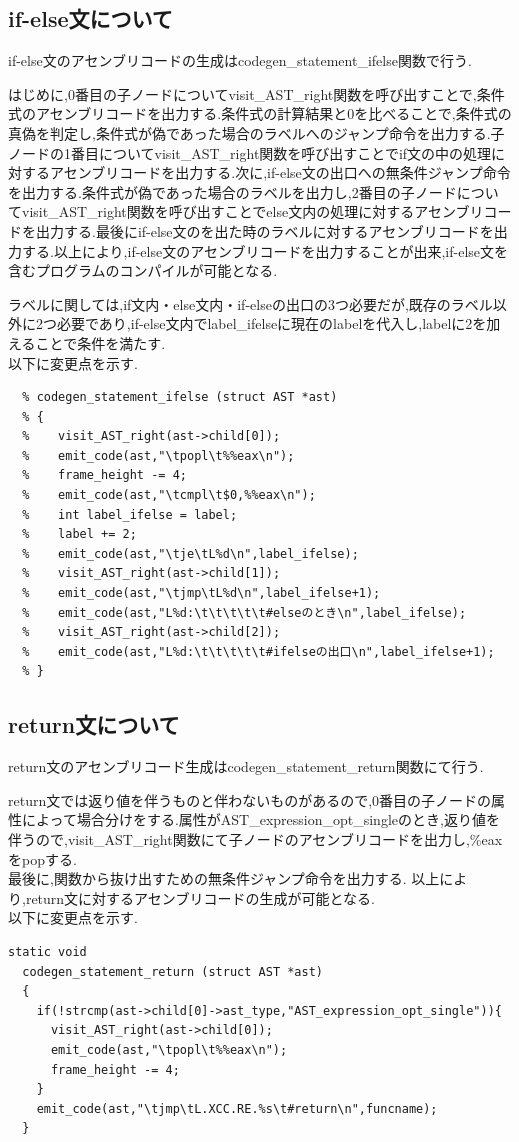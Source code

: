 \documentclass[10pt]{jsarticle}
\begin{document}
\subsection{if-else文について}
if-else文のアセンブリコードの生成はcodegen\_statement\_ifelse関数で行う.
\par はじめに,0番目の子ノードについてvisit\_AST\_right関数を呼び出すことで,条件式のアセンブリコードを出力する.条件式の計算結果と0を比べることで,条件式の真偽を判定し,条件式が偽であった場合のラベルへのジャンプ命令を出力する.子ノードの1番目についてvisit\_AST\_right関数を呼び出すことでif文の中の処理に対するアセンブリコードを出力する.次に,if-else文の出口への無条件ジャンプ命令を出力する.条件式が偽であった場合のラベルを出力し,2番目の子ノードについてvisit\_AST\_right関数を呼び出すことでelse文内の処理に対するアセンブリコードを出力する.最後にif-else文のを出た時のラベルに対するアセンブリコードを出力する.以上により,if-else文のアセンブリコードを出力することが出来,if-else文を含むプログラムのコンパイルが可能となる.
\par ラベルに関しては,if文内・else文内・if-elseの出口の3つ必要だが,既存のラベル以外に2つ必要であり,if-else文内でlabel\_ifelseに現在のlabelを代入し,labelに2を加えることで条件を満たす.\\
以下に変更点を示す.
\begin{lstlisting}[caption=codegen\_statement\_ifelse]
  % static void
  % codegen_statement_ifelse (struct AST *ast)
  % {
  %    visit_AST_right(ast->child[0]);
  %    emit_code(ast,"\tpopl\t%%eax\n");
  %    frame_height -= 4;
  %    emit_code(ast,"\tcmpl\t$0,%%eax\n");
  %    int label_ifelse = label;
  %    label += 2;
  %    emit_code(ast,"\tje\tL%d\n",label_ifelse);
  %    visit_AST_right(ast->child[1]);
  %    emit_code(ast,"\tjmp\tL%d\n",label_ifelse+1);
  %    emit_code(ast,"L%d:\t\t\t\t\t#elseのとき\n",label_ifelse);
  %    visit_AST_right(ast->child[2]);
  %    emit_code(ast,"L%d:\t\t\t\t\t#ifelseの出口\n",label_ifelse+1);
  % }
\end{lstlisting}

\subsection{return文について}
return文のアセンブリコード生成はcodegen\_statement\_return関数にて行う.
\par return文では返り値を伴うものと伴わないものがあるので,0番目の子ノードの属性によって場合分けをする.属性がAST\_expression\_opt\_singleのとき,返り値を伴うので,visit\_AST\_right関数にて子ノードのアセンブリコードを出力し,\%eaxをpopする.\\
最後に,関数から抜け出すための無条件ジャンプ命令を出力する. 以上により,return文に対するアセンブリコードの生成が可能となる.\\
以下に変更点を示す.
\begin{lstlisting}[caption=codegen\_statement\_return関数]
  static void
  codegen_statement_return (struct AST *ast)
  {
    if(!strcmp(ast->child[0]->ast_type,"AST_expression_opt_single")){
      visit_AST_right(ast->child[0]);
      emit_code(ast,"\tpopl\t%%eax\n");
      frame_height -= 4;
    }
    emit_code(ast,"\tjmp\tL.XCC.RE.%s\t#return\n",funcname);
  }
\end{lstlisting}
\end{document}

